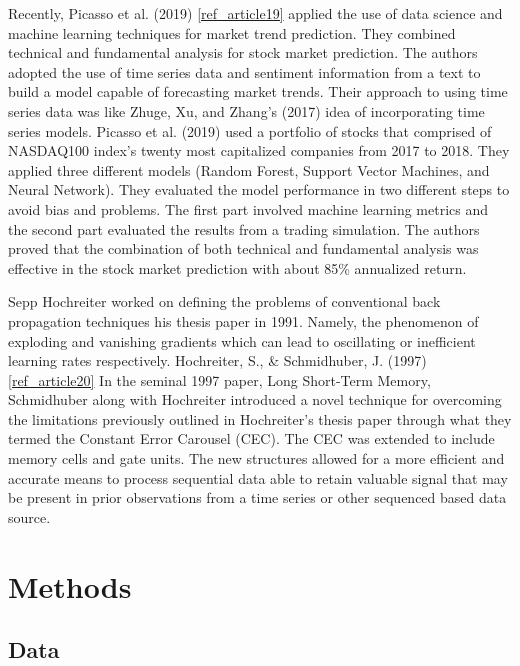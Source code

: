 \documentclass{llncs}
\begin{document}
Recently, Picasso et al. (2019) \ref{ref_article19} applied the use of data science and machine learning techniques for market trend prediction. They combined technical and fundamental analysis for stock market prediction. The authors adopted the use of time series data and sentiment information from a text to build a model capable of forecasting market trends. Their approach to using time series data was like Zhuge, Xu, and Zhang's (2017) idea of incorporating time series models. Picasso et al. (2019) used a portfolio of stocks that comprised of NASDAQ100 index's twenty most capitalized companies from 2017 to 2018. They applied three different models (Random Forest, Support Vector Machines, and Neural Network). They evaluated the model performance in two different steps to avoid bias and problems. The first part involved machine learning metrics and the second part evaluated the results from a trading simulation. The authors proved that the combination of both technical and fundamental analysis was effective in the stock market prediction with about 85\% annualized return.

Sepp Hochreiter worked on defining the problems of conventional back propagation techniques his thesis paper in 1991.  Namely, the phenomenon of exploding and vanishing gradients which can lead to oscillating or inefficient learning rates respectively.  Hochreiter, S., \& Schmidhuber, J. (1997) \ref{ref_article20}  In the seminal 1997 paper, Long Short-Term Memory, Schmidhuber along with Hochreiter introduced a novel technique for overcoming the limitations previously outlined in Hochreiter’s thesis paper through what they termed the Constant Error Carousel (CEC).  The CEC was extended to include memory cells and gate units.  The new structures allowed for a more efficient and accurate means to process sequential data able to retain valuable signal that may be present in prior observations from a time series or other sequenced based data source.


\section{Methods}

\subsection{Data}
\end{document}
